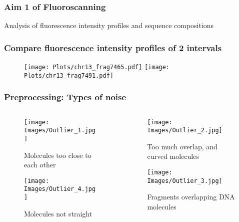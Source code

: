\documentclass[10pt,dvipsnames,table]{beamer}
\begin{document}
\begin{frame}
\frametitle{Aim 1 of Fluoroscanning}
\Large
Analysis of fluorescence intensity profiles and sequence compositions
\end{frame}

\begin{frame}
\frametitle{Compare fluorescence intensity profiles of 2 intervals}
\begin{figure}[t]
\texttt{[image: Plots/chr13\_frag7465.pdf]}
\texttt{[image: Plots/chr13\_frag7491.pdf]}
\end{figure}
\end{frame}

\begin{frame}
\frametitle{Preprocessing: Types of noise}
\begin{columns}[t]
\begin{column}{0.6\textwidth}
\begin{figure}[H]
\begin{center}
\texttt{[image: Images/Outlier\_1.jpg]}
\end{center}
\caption{Molecules too close to each other}
\end{figure}

\begin{figure}[H]
\begin{center}
\texttt{[image: Images/Outlier\_4.jpg]}
\end{center}
\caption{Molecules not straight}
\end{figure}

\end{column}
\begin{column}{0.4\textwidth}
\begin{figure}[H]
\begin{center}
\texttt{[image: Images/Outlier\_2.jpg]}
\end{center}
\caption{Too much overlap, and curved molecules}
\end{figure}

\begin{figure}[H]
\begin{center}
\texttt{[image: Images/Outlier\_3.jpg]}
\end{center}
\caption{Fragments overlapping DNA molecules}
\end{figure}
\end{column}

\end{columns}
\end{frame}
\end{document}
